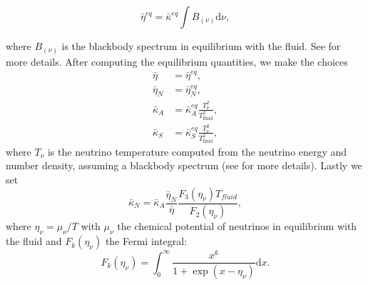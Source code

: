 \begin{equation}
\bar \eta^{eq} = \bar\kappa^{eq}\int B_{(\nu)}\mathrm{d}\nu,
\end{equation}

where $B_{(\nu)}$ is the blackbody spectrum in equilibrium with the fluid. See \cite{foucart2016impact} for more details.
After computing the equilibrium quantities, we make the choices
%
\begin{align}
  \bar \eta &= \bar \eta^{eq}, \\
  \bar \eta_N &= \bar \eta_N^{eq}, \\
  \bar \kappa_A &= \bar \kappa^{eq}_A\frac{T_\nu^2}{T_{\text{fluid}}^2}, \\
  \bar \kappa_S &= \bar \kappa^{eq}_S\frac{T_\nu^2}{T_{\text{fluid}}^2},
\end{align}
%
where $T_\nu$ is the neutrino temperature computed from the neutrino energy and number density, assuming a blackbody spectrum (see \cite{foucart2016impact} for more details). Lastly we set
%
\begin{equation}
\bar \kappa_N = \bar \kappa_A \frac{\bar\eta_N}{\bar\eta}\frac{F_3(\eta_\nu)T_{fluid}}{F_2(\eta_\nu)},
\end{equation}
%
where $\eta_\nu = \mu_\nu/T$ with $\mu_\nu$ the chemical potential of neutrinos in equilibrium with the fluid and $F_k(\eta_\nu)$ the Fermi integral:
%
\begin{equation}
F_k(\eta_\nu) = \int^\infty_0\frac{x^k}{1 + \exp(x - \eta_\nu)}\mathrm{d}x.
\end{equation}
%



